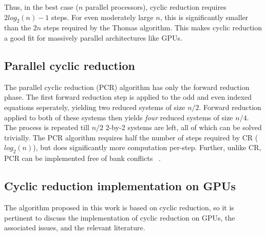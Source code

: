 Thus, in the best case ($n$ parallel processors),
cyclic reduction requires 
$2log_2(n) - 1$ steps.
For even moderately large $n$,
this is significantly smaller than
the $2n$ steps required by the Thomas algorithm.
This makes cyclic reduction a good fit
for massively parallel architectures like GPUs.

\subsection{Parallel cyclic reduction}

The parallel cyclic reduction (PCR) algorithm
has only the forward reduction phase.
The first forward reduction step is applied to
the odd and even indexed equations seperately,
yielding two reduced systems
of size $n/2$.
Forward reduction applied to both of these
systems then yields \emph{four} reduced
systems of size $n/4$.
The process is repeated till
$n/2$ 2-by-2 systems are left,
all of which can be solved trivially.
The PCR algorithm requires half the number of steps
required by CR ($log_2(n)$),
but does significantly more computation per-step.
Further, unlike CR,
PCR can be implemented free of bank conflicts
~\cite{Zhang2010FTS}.

\subsection{Cyclic reduction implementation on GPUs}
\label{subsec:cyclic-reduction-gpu-implementation}

The algorithm proposed in this work is based on cyclic reduction,
so it is pertinent to discuss the
implementation of cyclic reduction on GPUs,
the associated issues,
and the relevant literature.

